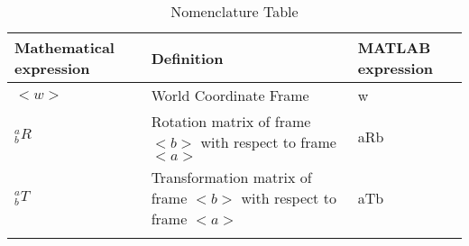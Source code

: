 \section*{}
\begin{longtable}{|p{4cm}|p{4cm}|p{4cm}|}
    \hline
    Mathematical expression & Definition & MATLAB expression \\
    \hline 
    $<w>$ & World Coordinate Frame &  w\\[0.4cm]
    $^a_b R$ & Rotation matrix of frame $<b>$ with respect to frame $<a>$  & aRb \\[1.2cm]
    $^a_b T$ & Transformation matrix of frame $<b>$ with respect to frame $<a>$ & aTb \\[1.2cm]
    \hline
    \caption{Nomenclature Table}
\end{longtable}
